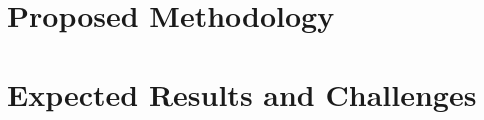 \documentclass[letterpaper,twocolumn,10pt]{article}
\begin{document}
\section{Proposed Methodology}

\section{Expected Results and Challenges}



\end{document}
